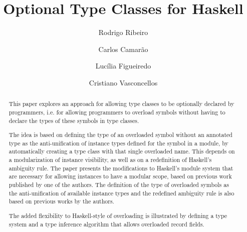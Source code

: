 \documentclass{llncs}
\begin{document}




%
\mainmatter              %

\title{Optional Type Classes for Haskell}

%
\author{Rodrigo Ribeiro  \and Carlos Camar\~ao \and Luc\'ilia
Figueiredo \and Cristiano Vasconcellos}
\maketitle              %

\begin{abstract}

This paper explores an approach for allowing type classes to be
optionally declared by programmers, i.e. for allowing programmers to
overload symbols without having to declare the types of these symbols
in type classes.

The idea is based on defining the type of an overloaded symbol without
an annotated type as the anti-unification of instance types defined for
the symbol in a module, by automatically creating a type class with
that single overloaded name. This depends on a modularization of
instance visibility, as well as on a redefinition of Haskell's
ambiguity rule. The paper presents the modifications to Haskell's
module system that are necessary for allowing instances to have a
modular scope, based on previous work published by one of the
authors. The definition of the type of overloaded symbols as the
anti-unification of available instance types and the redefined
ambiguity rule is also based on previous works by the authors.

The added flexibility to Haskell-style of overloading is illustrated
by defining a type system and a type inference algorithm that allows
overloaded record fields.


\end{abstract}







% 





% 





\end{document}

